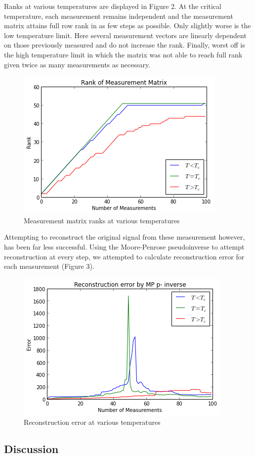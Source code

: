 \documentclass{article} %
\begin{document}
Ranks at various temperatures are displayed in Figure 2.
At the critical temperature, each measurement remains independent and the
measurement matrix attains full row rank in as few steps as possible.  Only
slightly worse is the low temperature limit.  Here several measurement vectors are
linearly dependent on those previously measured and do not increase the rank.
Finally, worst off is the high temperature limit in which the matrix was not able
to reach full rank given twice as many measurements as necessary.
\begin{figure}[h]
\begin{center}
\includegraphics[width=0.5\linewidth]{Ranks.png}
\end{center}
\caption{Measurement matrix ranks at various temperatures}
\end{figure}

Attempting to reconstruct the original signal from these measurement however, has
been far less successful.  Using the Moore-Penrose pseudoinverse to attempt
reconstruction at every step, we attempted to calculate reconstruction error
for each measurement (Figure 3).  
\begin{figure}[h]
\begin{center}
\includegraphics[width=0.5\linewidth]{errors.png}
\end{center}
\caption{Reconstruction error at various temperatures}
\end{figure}

\subsection{Discussion}
\end{document}
